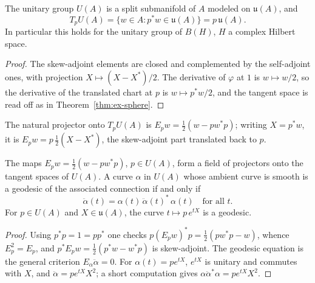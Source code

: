 \begin{theorem}
  \label{thm:ex-unitary}
  \leanok
  The unitary group $U(A)$ is a split submanifold of $A$ modeled on $\mathfrak u(A)$, and
  \[
    T_pU(A) = \{w \in A : p^* w \in \mathfrak u(A)\} = p\,\mathfrak u(A) .
  \]
  In particular this holds for the unitary group of $B(H)$, $H$ a complex Hilbert space.
\end{theorem}

\begin{proof}
  \leanok
  The skew-adjoint elements are closed and complemented by the self-adjoint ones, with
  projection $X \mapsto (X - X^*)/2$. The derivative of $\varphi$ at $1$ is $w \mapsto w/2$, so
  the derivative of the translated chart at $p$ is $w \mapsto p^* w/2$, and the tangent space
  is read off as in Theorem~\ref{thm:ex-sphere}.
\end{proof}

The natural projector onto $T_pU(A)$ is $E_p w = \tfrac12(w - p w^* p)$; writing $X = p^* w$, it
is $E_p w = p\,\tfrac12(X - X^*)$, the skew-adjoint part translated back to $p$.

\begin{theorem}
  \label{thm:ex-unitary-geodesics}
  \leanok
  The maps $E_p w = \tfrac12(w - p w^* p)$, $p \in U(A)$, form a field of projectors onto the
  tangent spaces of $U(A)$. A curve $\alpha$ in $U(A)$ whose ambient curve is smooth is a
  geodesic of the associated connection if and only if
  \[
    \ddot\alpha(t) = \alpha(t)\, \ddot\alpha(t)^*\, \alpha(t) \quad \text{for all } t .
  \]
  For $p \in U(A)$ and $X \in \mathfrak u(A)$, the curve $t \mapsto p\, e^{tX}$ is a geodesic.
\end{theorem}

\begin{proof}
  \leanok
  Using $p^*p = 1 = pp^*$ one checks $p (E_p w)^* p = \tfrac12(p w^* p - w)$, whence
  $E_p^2 = E_p$, and $p^* E_p w = \tfrac12(p^* w - w^* p)$ is skew-adjoint. The geodesic
  equation is the general criterion $E_{\alpha}\ddot\alpha = 0$. For $\alpha(t) = p e^{tX}$,
  $e^{tX}$ is unitary and commutes with $X$, and $\ddot\alpha = p e^{tX}X^2$; a short
  computation gives $\alpha\ddot\alpha^*\alpha = p e^{tX} X^2$.
\end{proof}

